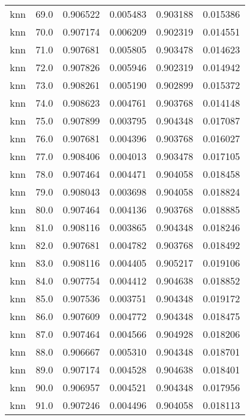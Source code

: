 \begin{tabular}{lrrrrr}
     knn &       69.0 &    0.906522 &   0.005483 &   0.903188 &  0.015386 \\
     knn &       70.0 &    0.907174 &   0.006209 &   0.902319 &  0.014551 \\
     knn &       71.0 &    0.907681 &   0.005805 &   0.903478 &  0.014623 \\
     knn &       72.0 &    0.907826 &   0.005946 &   0.902319 &  0.014942 \\
     knn &       73.0 &    0.908261 &   0.005190 &   0.902899 &  0.015372 \\
     knn &       74.0 &    0.908623 &   0.004761 &   0.903768 &  0.014148 \\
     knn &       75.0 &    0.907899 &   0.003795 &   0.904348 &  0.017087 \\
     knn &       76.0 &    0.907681 &   0.004396 &   0.903768 &  0.016027 \\
     knn &       77.0 &    0.908406 &   0.004013 &   0.903478 &  0.017105 \\
     knn &       78.0 &    0.907464 &   0.004471 &   0.904058 &  0.018458 \\
     knn &       79.0 &    0.908043 &   0.003698 &   0.904058 &  0.018824 \\
     knn &       80.0 &    0.907464 &   0.004136 &   0.903768 &  0.018885 \\
     knn &       81.0 &    0.908116 &   0.003865 &   0.904348 &  0.018246 \\
     knn &       82.0 &    0.907681 &   0.004782 &   0.903768 &  0.018492 \\
     knn &       83.0 &    0.908116 &   0.004405 &   0.905217 &  0.019106 \\
     knn &       84.0 &    0.907754 &   0.004412 &   0.904638 &  0.018852 \\
     knn &       85.0 &    0.907536 &   0.003751 &   0.904348 &  0.019172 \\
     knn &       86.0 &    0.907609 &   0.004772 &   0.904348 &  0.018475 \\
     knn &       87.0 &    0.907464 &   0.004566 &   0.904928 &  0.018206 \\
     knn &       88.0 &    0.906667 &   0.005310 &   0.904348 &  0.018701 \\
     knn &       89.0 &    0.907174 &   0.004528 &   0.904638 &  0.018401 \\
     knn &       90.0 &    0.906957 &   0.004521 &   0.904348 &  0.017956 \\
     knn &       91.0 &    0.907246 &   0.004496 &   0.904058 &  0.018113 \\

\end{tabular}
